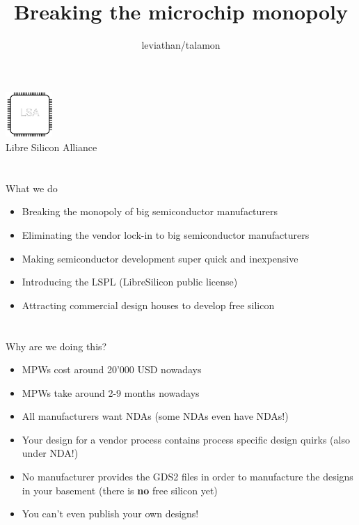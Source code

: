 \documentclass[9pt]{beamer}
\author{leviathan/talamon}
\title{Breaking the microchip monopoly}
\begin{document}
\begin{frame}
	\titlepage
	\begin{center}
		\includegraphics[width=50pt,height=50pt]{lsa.png}
		\\ Libre Silicon Alliance
	\end{center}
\end{frame}


\section[What]{}
\begin{frame}{What we do}
	\begin{itemize}
        \setlength\itemsep{1em}
		\item Breaking the monopoly of big semiconductor manufacturers
		\item Eliminating the vendor lock-in to big semiconductor manufacturers
		\item Making semiconductor development super quick and inexpensive
		\item Introducing the LSPL (LibreSilicon public license)
		\item Attracting commercial design houses to develop free silicon
	\end{itemize}
\end{frame}

\section[Why]{}
\begin{frame}{Why are we doing this?}
	\begin{itemize}
		\item MPWs cost around 20'000 USD nowadays
		\item MPWs take around 2-9 months nowadays
		\item All manufacturers want NDAs (some NDAs even have NDAs!)
		\item Your design for a vendor process contains process specific design quirks (also under NDA!)
		\item No manufacturer provides the GDS2 files in order to manufacture the designs in your basement (there is \textbf{no} free silicon yet)
		\item You can't even publish your own designs!
	\end{itemize}
\end{frame}
\end{document}
